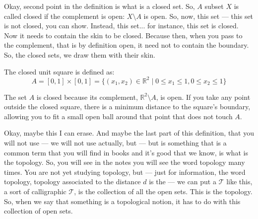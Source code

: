 \begin{spoken-clean}[00:08:37 - 00:10:16]
Okay, second point in the definition is what is a closed set.  So, $A$ subset $X$ is called closed if the complement is open: $X \setminus A$ is open. So, now, this set --- this set is not closed, you can show. Instead, this set...  for instance, this set is closed. Now it needs to contain the skin to be closed. Because then, when you pass to the complement, that is by definition open, it need not to contain the boundary. So, the closed sets, we draw them with their skin.
\end{spoken-clean}

\begin{math-stroke}
The closed unit square is defined as:
\[ A = [0, 1] \times [0, 1] = \{ (x_1, x_2) \in \mathbb{R}^2 \mid 0 \le x_1 \le 1, 0 \le x_2 \le 1 \} \]
\begin{center}
\end{center}
\begin{explanation-of-steps}
The set $A$ is closed because its complement, $\mathbb{R}^2 \setminus A$, is open. If you take any point outside the closed square, there is a minimum distance to the square's boundary, allowing you to fit a small open ball around that point that does not touch $A$.
\end{explanation-of-steps}
\end{math-stroke}


\begin{spoken-clean}[00:10:16 - 00:11:35]
Okay, maybe this I can erase. And maybe the last part of this definition, that you will not use --- we will not use actually, but --- but is something that is a common term that you will find in books and it's good that we know, is what is the topology. So, you will see in the notes you will see the word topology many times. You are not yet studying topology, but --- just for information, the word topology, topology associated to the distance $d$ is the --- we can put a $\mathcal{T}$ like this, a sort of calligraphic $\mathcal{T}$, is the collection of all the open sets. This is the topology. So, when we say that something is a topological notion, it has to do with this collection of open sets.
\end{spoken-clean}

